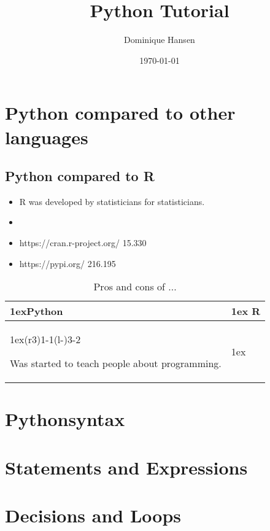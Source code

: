 \documentclass{article}
\title{Python Tutorial}
\author{Dominique Hansen}
\date{\today}
\begin{document}
\maketitle

\section{Python compared to other languages}

\subsection{Python compared to R}

\begin{itemize}
    \item R was developed by statisticians for statisticians.
    \item 
    \item https://cran.r-project.org/ 15.330
    \item https://pypi.org/ 216.195
\end{itemize}

\begin{table}
\begin{tabularx}{\linewidth}{>{\parskip1ex}X@{\kern4\tabcolsep}>{\parskip1ex}X}
\toprule
\hfil\bfseries Python
&
\hfil\bfseries R
\\\cmidrule(r{3\tabcolsep}){1-1}\cmidrule(l{-\tabcolsep}){3-2}

Was started to teach people about programming.

&



\\\bottomrule
\end{tabularx}
\caption{Pros and cons of ...}
\end{table}



\section{Pythonsyntax}
\section{Statements and Expressions}
\section{Decisions and Loops}
\end{document}
